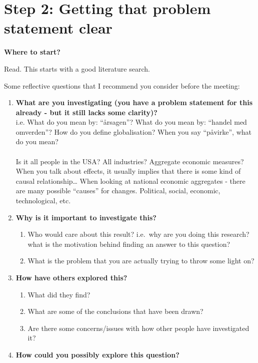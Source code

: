 \documentclass[
]{book}
\begin{document}
\hypertarget{step-2-getting-that-problem-statement-clear}{%
\section{Step 2: Getting that problem statement clear}\label{step-2-getting-that-problem-statement-clear}}

\textbf{Where to start?}

Read. This starts with a good literature search.

Some reflective questions that I recommend you consider before the meeting:

\begin{enumerate}
\def\labelenumi{\arabic{enumi}.}
\item
  \textbf{What are you investigating (you have a problem statement for this already - but it still lacks some clarity)?}\\
  i.e.
  What do you mean by: ``årsagen''?
  What do you mean by: ``handel med omverden''?
  How do you define globalisation?
  When you say ``påvirke'', what do you mean?\\
  ~\\
  Is it all people in the USA? All industries? Aggregate economic measures?\\
  When you talk about effects, it usually implies that there is some kind of causal relationship\ldots{} When looking at national economic aggregates - there are many possible ``causes'' for changes. Political, social, economic, technological, etc.
\item
  \textbf{Why is it important to investigate this?}

  \begin{enumerate}
  \def\labelenumii{\arabic{enumii}.}
  \item
    Who would care about this result? i.e.~why are you doing this research? what is the motivation behind finding an answer to this question?
  \item
    What is the problem that you are actually trying to throw some light on?
  \end{enumerate}
\item
  \textbf{How have others explored this?}

  \begin{enumerate}
  \def\labelenumii{\arabic{enumii}.}
  \item
    What did they find?
  \item
    What are some of the conclusions that have been drawn?
  \item
    Are there some concerns/issues with how other people have investigated it?
  \end{enumerate}
\item
  \textbf{How could you possibly explore this question?}


\end{enumerate}
\end{document}
